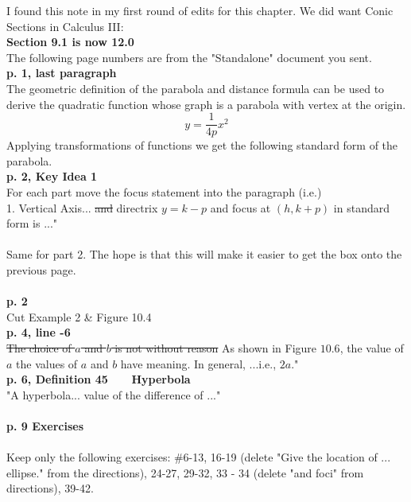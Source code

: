 \documentclass[11pt]{report}
\begin{document}
I found this note in my first round of edits for this chapter. We did want Conic Sections in Calculus III:\\
\textbf{Section 9.1 is now 12.0}\\

The following page numbers are from the "Standalone" document you sent.\\

\textbf{p. 1, last paragraph}\\
The geometric definition of the parabola and distance formula can be used to derive the quadratic function whose graph is a parabola with vertex at the origin.
$$y=\frac{1}{4p}x^2$$
Applying transformations of functions we get the following standard form of the parabola.\\ 

\textbf{p. 2, Key Idea 1}\\
For each part move the focus statement into the paragraph (i.e.)\\
1. Vertical Axis... \sout{and} directrix $y=k-p$ and focus at $(h, k+p)$ in standard form is ..."\\ \\
Same for part 2. The hope is that this will make it easier to get the box onto the previous page. \\ \\

\textbf{p. 2}\\
Cut Example 2 \& Figure 10.4\\

\textbf{p. 4, line -6}\\
\sout{The choice of $a$ and $b$ is not without reason} As shown in Figure $10.6$, the value of $a$ the values of $a$ and $b$ have meaning. In general, ...i.e., $2a$."\\

\textbf{p. 6, Definition 45~~~ Hyperbola}\\
"A hyperbola... value of the difference of ..."\\ \\

\textbf{p. 9 Exercises}\\ \\
Keep only the following exercises: \#6-13, 16-19 (delete "Give the location of ... ellipse." from the directions), 24-27, 29-32, 33 - 34 (delete "and foci" from directions), 39-42.
\end{document}
